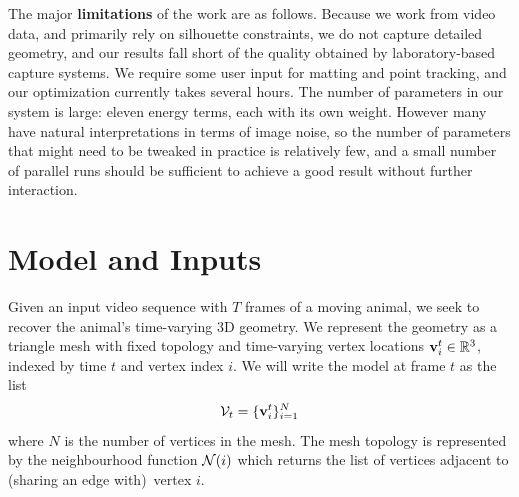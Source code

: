 \documentclass[preprint]{acmsiggraph}
\begin{document}
The major {\bf limitations} of the work are as follows.  Because we work
from video data, and primarily rely on silhouette constraints, we do
not capture detailed geometry, and our
results fall short of the quality obtained by laboratory-based capture
systems.  %
We require some user input for matting and point tracking, and our optimization currently takes several hours.
%
The number of parameters in our system is large: eleven energy terms, each with its own weight.   However many have natural interpretations in terms of image noise, so the number of parameters that might need to be tweaked in practice is relatively few, and a small number of parallel runs should be sufficient to achieve a good result without further interaction.


\section{Model and Inputs}
\label{sec:problem}
Given an input video sequence with $T$ frames of a moving animal, we seek to recover
the animal's time-varying 3D geometry. We represent the geometry as a
triangle mesh with fixed topology and time-varying vertex
locations $\mathbf{v}_i^t \in \mathbb R^3$, indexed by time $t$ and vertex index $i$.  We will write the model at frame $t$ as the list
\begin{equation}
\mathcal{V}_t = \{\mathbf{v}_i^t\}_{i=1}^N 
\end{equation}
where $N$ is the number of vertices in the mesh.   The mesh topology is represented by the neighbourhood function $\mathcal{N}(i)$ which returns the list of vertices adjacent to (sharing an edge with)~vertex $i$.
\end{document}
